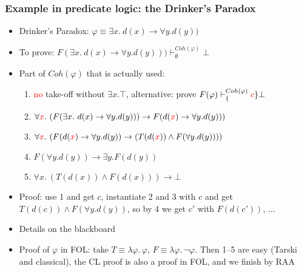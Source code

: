 \documentclass[handout,11pt]{beamer}
\newcommand{\red}[1]{\textcolor{red}{#1}}
\newcommand{\set}[1]{\{#1\}}
\newcommand{\imp}{\rightarrow}
\begin{document}
\begin{frame}
\frametitle{Example in predicate logic: the Drinker's Paradox}
 \begin{itemize}[<+->] 
    \item Drinker's Paradox: $\varphi\equiv\exists x.~d(x)\to \forall y.d(y))$
    \item To prove: $F(\exists x.~d(x)\to \forall y.d(y))) 
    \vdash^{Coh(\varphi)}_\emptyset\bot$    
    \item Part of $Coh(\varphi)$ that is actually used:
    \begin{enumerate}[<+->]
    	\item \red{no} take-off without $\exists x. \top$, 
    	alternative: prove $F(\varphi)\vdash^{Coh(\varphi)}_\set{\red{c}}\bot$
    	\item $\forall\red{x}.~( F(\exists x.~d(x)\to \forall y.d(y))) \imp 
    	F(d(\red{x})\to \forall y.d(y)))$
    	\item $\forall\red{x}.~(F(d(\red{x})\to \forall y.d(y)) \imp 
    	(T(d(\red{x})) \wedge F(\forall y.d(y))))$
    	\item $F(\forall y.d(y)) \imp \exists y. F(d(y))$
    	\item $\forall x.~(T(d(x)) \wedge F(d(x))) \imp \bot$   	
    \end{enumerate}
    \item Proof: use 1 and get $c$, instantiate 2 and 3 with $c$
    and get $T(d(c)) \wedge F(\forall y.d(y))$, so by 4 we get $c'$
    with $F(d(c'))$, ...
    \item Details on the blackboard    
    \item Proof of $\varphi$ in FOL: take $T\equiv\lambda\varphi.\,\varphi$,
     $F\equiv\lambda\varphi.\,\neg\varphi$. Then 1--5 are easy
     (Tarski and classical), the CL proof is also a proof in FOL,
     and we finish by RAA
 \end{itemize}
\end{frame}
\end{document}
